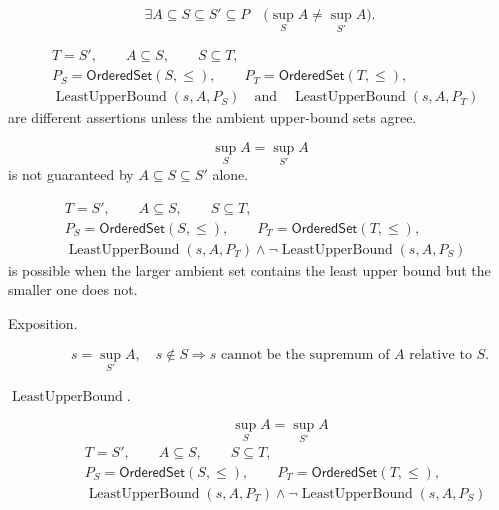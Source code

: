 \begin{remark*}
\[
\exists A\subseteq S\subseteq S'\subseteq P
\quad
\bigl(\sup_S A\ne\sup_{S'}A\bigr).
\]
\end{remark*}

\begin{remark*}
\[
\begin{aligned}
&T=S',\qquad A\subseteq S,\qquad S\subseteq T,\\
&P_S=\mathsf{OrderedSet}(S,\leq),\qquad
P_T=\mathsf{OrderedSet}(T,\leq),\\
&\operatorname{LeastUpperBound}(s,A,P_S)
\quad\text{and}\quad
\operatorname{LeastUpperBound}(s,A,P_T)
\end{aligned}
\]
are different assertions unless the ambient upper-bound sets agree.
\end{remark*}

\begin{remark*}
\[
\sup_S A=\sup_{S'} A
\]
is not guaranteed by $A\subseteq S\subseteq S'$ alone.
\end{remark*}

\begin{remark*}
\[
\begin{aligned}
&T=S',\qquad A\subseteq S,\qquad S\subseteq T,\\
&P_S=\mathsf{OrderedSet}(S,\leq),\qquad
P_T=\mathsf{OrderedSet}(T,\leq),\\
&\operatorname{LeastUpperBound}(s,A,P_T)\land
\neg\operatorname{LeastUpperBound}(s,A,P_S)
\end{aligned}
\]
is possible when the larger ambient set contains the least upper bound but the smaller one does not.
\end{remark*}

\begin{remark*}
\begin{description}
  \item[Exposition.]
\[
s=\sup_{S'} A,\quad s\notin S
\Longrightarrow
s\text{ cannot be the supremum of }A\text{ relative to }S.
\]


  \item[\(\operatorname{LeastUpperBound}.\)]
  \[
\sup_S A=\sup_{S'} A
\]
\[
\begin{aligned}
&T=S',\qquad A\subseteq S,\qquad S\subseteq T,\\
&P_S=\mathsf{OrderedSet}(S,\leq),\qquad
P_T=\mathsf{OrderedSet}(T,\leq),\\
&\operatorname{LeastUpperBound}(s,A,P_T)\land
\neg\operatorname{LeastUpperBound}(s,A,P_S)
\end{aligned}
\]
\end{description}
\end{remark*}

